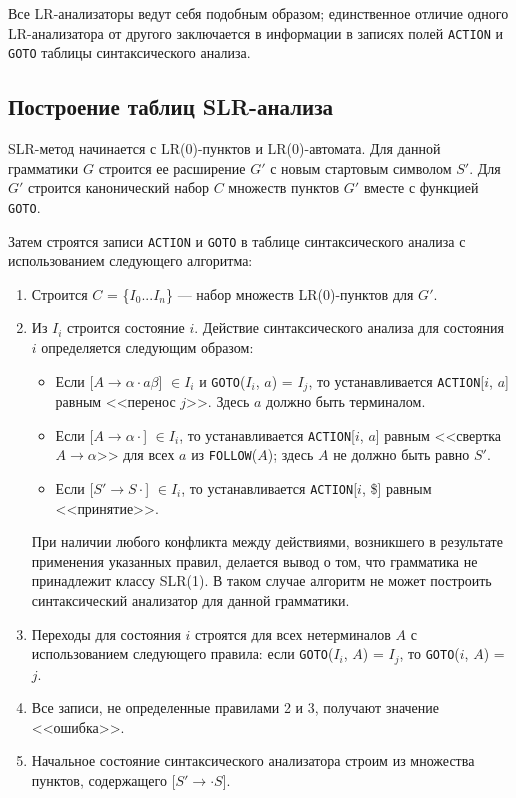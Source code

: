 \documentclass[bachelor, och, coursework, times]{SCWorks}
\begin{document}
Все LR-анализаторы ведут себя подобным образом; единственное отличие одного LR-анализатора от другого заключается в информации в записях полей \verb|ACTION| и \verb|GOTO| таблицы синтаксического анализа.~\cite{Compilers}


\subsection{Построение таблиц SLR-анализа }

SLR-метод начинается с LR(0)-пунктов и LR(0)-автомата. Для данной грамматики $G$ строится ее расширение $G'$ с новым стартовым символом $S'$. Для $G'$ строится канонический набор $C$ множеств пунктов $G'$ вместе с функцией \verb|GOTO|. 

Затем строятся записи \verb|ACTION| и \verb|GOTO| в таблице синтаксического анализа с  использованием следующего алгоритма:
\begin{enumerate} 
	\item Строится $C$ = \{$I_0...I_n$\} — набор множеств LR(0)-пунктов для $G'$. 
	\item Из $I_i$ строится состояние $i$. Действие синтаксического анализа для состояния $i$ определяется следующим образом:
	\begin{itemize}
		\item Если [$A \to \alpha \cdot a\beta$] $\in I_i$ и \verb|GOTO|($I_i$, $a$) = $I_j$, то устанавливается \linebreak
		\verb|ACTION|[$i$, $a$] равным <<перенос $j$>>. Здесь $a$ должно быть терминалом. 
		\item Если [$A \to \alpha \cdot$] $\in I_i$, то устанавливается \verb|ACTION|[$i$, $a$] равным <<свертка $A \to \alpha$>> для всех $a$ из \verb|FOLLOW|($A$); здесь $A$ не должно быть равно $S'$. 
		\item Если [$S' \to S \cdot$] $\in I_i$, то устанавливается \verb|ACTION|[$i$, \$] равным <<принятие>>. 
	\end{itemize}
	При наличии любого конфликта между действиями, возникшего в результате применения указанных правил, делается вывод о том, что грамматика не принадлежит классу SLR(1). В таком случае алгоритм не может построить синтаксический анализатор для данной грамматики. 
	\item Переходы для состояния $i$ строятся для всех нетерминалов $A$ с  использованием следующего правила: если \verb|GOTO|($I_i$, $A$) = $I_j$, то \verb|GOTO|($i$, $A$) = $j$.
	\item Все записи, не определенные правилами 2 и 3, получают значение <<ошибка>>. 
	\item Начальное состояние синтаксического анализатора строим из множества пунктов, содержащего [$S' \to \cdot S$]. 
\end{enumerate}
\end{document}
